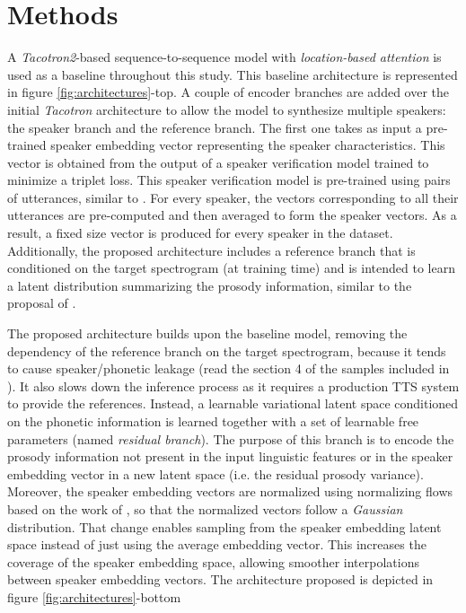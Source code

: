 \section{Methods}
A \textit{Tacotron2}-based sequence-to-sequence model with \textit{location-based attention} \autocite{Wang2017} is used as a baseline throughout this study. This baseline architecture is represented in figure \ref{fig:architectures}-top. A couple of encoder branches are added over the initial \textit{Tacotron} architecture to allow the model to synthesize multiple speakers: the speaker branch and the reference branch. The first one takes as input a pre-trained speaker embedding vector representing the speaker characteristics. This vector is obtained from the output of a speaker verification model trained to minimize a triplet loss. This speaker verification model is pre-trained using pairs of utterances, similar to  \autocite{Ren2019}. For every speaker, the vectors corresponding to all their utterances are pre-computed and then averaged to form the speaker vectors. As a result, a fixed size vector is produced for every speaker in the dataset. Additionally, the proposed architecture includes a reference branch that is conditioned on the target spectrogram (at training time) and is intended to learn a latent distribution summarizing the prosody information, similar to the proposal of \autocite{skerryryan2018}.




The proposed architecture builds upon the baseline model, removing the dependency of the reference branch on the target spectrogram, because it tends to cause speaker/phonetic leakage (read the section 4 of the samples included in \autocite{skerryryan2018}). It also slows down the inference process as it requires a production TTS system to provide the references. Instead, a learnable variational latent space conditioned on the phonetic information is learned together with a set of learnable free parameters (named \textit{residual branch}). The purpose of this branch is to encode the prosody information not present in the input linguistic features or in the speaker embedding vector in a new latent space (i.e. the residual prosody variance). Moreover, the speaker embedding vectors are normalized using normalizing flows based on the work of \autocite{kingma2018}, so that the normalized vectors follow a \textit{Gaussian} distribution. That change enables sampling from the speaker embedding latent space instead of just using the average embedding vector. This increases the coverage of the speaker embedding space, allowing smoother interpolations between speaker embedding vectors. The architecture proposed is depicted in figure \ref{fig:architectures}-bottom

